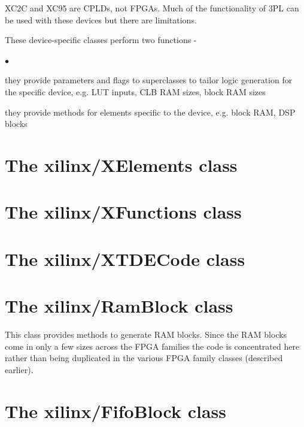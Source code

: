 \documentclass[10pt,a4paper,twoside,fleqn]{book}
\newcommand{\blist}{\begin{list}{$\bullet$}{\setlength{\itemsep}{-5pt}\setlength{\topsep}{-5pt}}}
\newcommand{\blend}{\end{list}}
\begin{document}
        XC2C and XC95 are CPLDs, not FPGAs. Much of the functionality of
        3PL can be used with these devices but there are limitations.
        
        These device-specific classes perform two functions -
        
        \blist
        \item   they provide parameters and flags to superclasses to
                tailor logic generation for the specific device, e.g.
                LUT inputs, CLB RAM sizes, block RAM sizes
        \item   they provide methods for elements specific to the
                device, e.g. block RAM, DSP blocks
        \blend

        

    \section{The xilinx/XElements class}
    
        
    
    
    \section{The xilinx/XFunctions class}
    
        
    
    
    
    \section{The xilinx/XTDECode class}
    
        



    \section{The xilinx/RamBlock class}
    
        This class provides methods to generate RAM blocks. Since the RAM
        blocks come in only a few sizes across the FPGA families the code
        is concentrated here rather than being duplicated in the various
        FPGA family classes (described earlier).

    
    \section{The xilinx/FifoBlock class}
\end{document}
